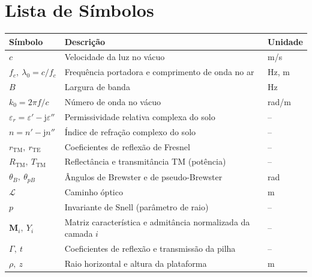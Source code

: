 \documentclass[12pt,a4paper,oneside]{book}
\theoremstyle{remark}
\newcommand{\jj}{\mathrm{j}}
\theoremstyle{plain}
\theoremstyle{definition}
\begin{document}
\chapter*{Lista de Símbolos}

{\small
\begin{longtable}{lll}
\toprule
Símbolo & Descrição & Unidade \\
\midrule
\endhead
$c$                                       & Velocidade da luz no vácuo                         & m/s       \\
$f_c,\ \lambda_0 = c/f_c$                 & Frequência portadora e comprimento de onda no ar    & Hz, m     \\
$B$                                       & Largura de banda                                    & Hz        \\
$k_0 = 2\pi f/c$                          & Número de onda no vácuo                             & rad/m     \\
$\varepsilon_r = \varepsilon'-\jj\varepsilon''$ & Permissividade relativa complexa do solo      & --        \\
$n = n'-\jj n''$                          & Índice de refração complexo do solo                 & --        \\
$r_{\text{TM}},\ r_{\text{TE}}$           & Coeficientes de reflexão de Fresnel                  & --        \\
$R_{\text{TM}},\ T_{\text{TM}}$           & Reflectância e transmitância TM (potência)          & --        \\
$\theta_B,\ \theta_{pB}$                  & Ângulos de Brewster e de pseudo-Brewster            & rad       \\
$\mathcal{L}$                             & Caminho óptico                                      & m         \\
$p$                                       & Invariante de Snell (parâmetro de raio)             & --        \\
$\mathbf{M}_i,\ Y_i$                      & Matriz característica e admitância normalizada da camada $i$ & --      \\
$\Gamma,\ t$                               & Coeficientes de reflexão e transmissão da pilha     & --        \\
$\rho,\ z$                                & Raio horizontal e altura da plataforma              & m         \\

\end{longtable}}
\end{document}
